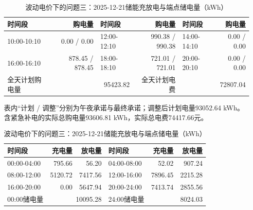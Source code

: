 \begin{table}[H]\centering\small\setlength{\tabcolsep}{5pt}
\caption{波动电价下的问题三：2025-12-21购电结果（电量：kWh；费用：元）}
\begin{tabular}{lrlrlr}\toprule
时间段 & 购电量 & 时间段 & 购电量 & 时间段 & 购电量 \\\midrule
10:00-10:10 & 0.00 / 0.00 & 12:00-12:10 & 990.38 / 990.38 & 14:00-14:10 & 0.00 / 0.00\\
16:00-16:10 & 878.45 / 878.45 & 18:00-18:10 & 721.01 / 721.01 & 20:00-20:10 & 0.00 / 0.00\\
\midrule 全天计划购电量 & \multicolumn{2}{r}{95423.82} & 全天计划电费 & \multicolumn{2}{r}{72807.04}\\\bottomrule
\end{tabular}
\par\vspace{2pt}\footnotesize
表内“计划 / 调整”分别为午夜承诺与最终承诺；调整后计划电量93052.64 kWh。
含紧急补电的实际总购电量93606.81 kWh，实际总电费74417.66元。
\vspace{3pt}\small
\caption{波动电价下的问题三：2025-12-21储能充放电与端点储电量（kWh）}
\begin{tabular}{lrrlrr}\toprule
时间段 & 充电量 & 放电量 & 时间段 & 充电量 & 放电量 \\\midrule
00:00-04:00 & 795.66 & 56.20 & 04:00-08:00 & 52.02 & 907.24\\
08:00-12:00 & 5120.72 & 7417.56 & 12:00-16:00 & 7896.45 & 2215.28\\
16:00-20:00 & 0.00 & 5647.94 & 20:00-24:00 & 7413.74 & 2855.56\\
\midrule 00:00储电量 & \multicolumn{2}{r}{10095.28} & 24:00储电量 & \multicolumn{2}{r}{8024.03}\\\bottomrule
\end{tabular}\end{table}
